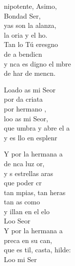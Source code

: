 \documentclass[12pt]{article}
\begin{document}
\begin{multicols*}{2}
\begin{cancion}%
	nipotente, Asimo,  \\
	Bondad Ser,\\
	yas son la alanza, \\
	la oria y el ho.\\
	Tan lo Tú eresgno  \\
	de a bendicn\\
	y nca es digno el mbre\\
	de har de mencn. \\
	\begin{chorus}%
	Loado as mi Seor\\
	por da criata\\
	por  hermano ,\\
	loo as mi Seor,\\
	que umbra y abre el a \\
	y es llo en esplenr\\
	\end{chorus}%
	Y por la hermana a\\
	de nca luz or,\\
	y s estrellas aras \\
	que  poder cr\\
	tan mpias, tan heras\\
	tan as como \\
	y illan en el elo\\
	Loo Seor\\
	Y por la hermana a \\
	preca en su can,\\
	que es til, casta, hilde: \\
	Loo mi Ser\\

\end{cancion}
\end{multicols*}
\end{document}
